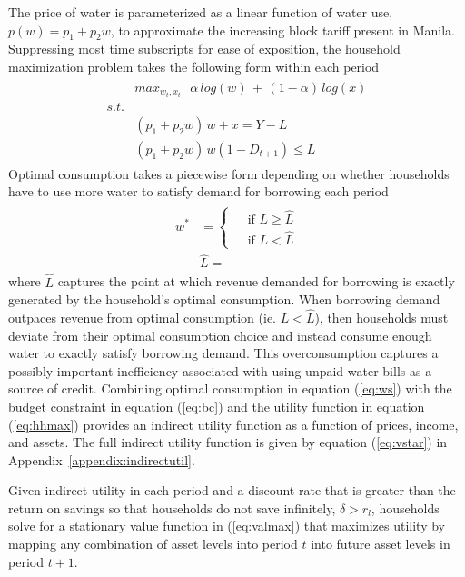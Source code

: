 \documentclass[12pt]{article}
\begin{document}
The price of water is parameterized as a linear function of water use, $p(w) = p_1 + p_2w$, to approximate the increasing block tariff present in Manila.  Suppressing most time subscripts for ease of exposition, the household maximization problem takes the following form within each period
\begin{align}\label{eq:hhmax}
\begin{split}
&max_{w_t,x_t} \,\,\,\, \alpha\, log(w) \, + \, (1-\alpha)\,log(x) \\
s.t.& \\
\,\,\,\, &(p_1 + p_2 w)\,w + x  =  Y - L \\
&(p_1 + p_2 w)\,w (1-D_{t+1}) \leq L  
\end{split}
\end{align}
Optimal consumption takes a piecewise form depending on whether households have to use more water to satisfy demand for borrowing each period
\begin{align}\label{eq:ws}
\begin{split}
w^{*} &= 
\begin{cases}
 &\text{ if } L \geq \widehat{L} \\
 &\text{ if } L < \widehat{L}
\end{cases} \\
&\widehat{L} = 
\end{split}
\end{align}
where $\widehat{L}$ captures the point at which revenue demanded for borrowing is exactly generated by the household's optimal consumption.  When borrowing demand outpaces revenue from optimal consumption (ie. $L<\widehat{L}$), then households must deviate from their optimal consumption choice and instead consume enough water to exactly satisfy borrowing demand.  This overconsumption captures a possibly important inefficiency associated with using unpaid water bills as a source of credit.  Combining optimal consumption in equation (\ref{eq:ws}) with the budget constraint in equation (\ref{eq:bc}) and the utility function in equation (\ref{eq:hhmax}) provides an indirect utility function as a function of prices, income, and assets.  The full indirect utility function is given by equation (\ref{eq:vstar}) in Appendix~\ref{appendix:indirectutil}.

Given indirect utility in each period and a discount rate that is greater than the return on savings so that households do not save infinitely, $\delta> r_l$, households solve for a stationary value function in (\ref{eq:valmax}) that maximizes utility by mapping any combination of asset levels into period $t$ into future asset levels in period $t+1$.
\end{document}
